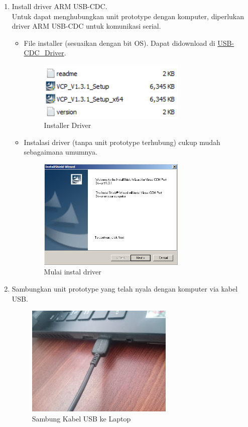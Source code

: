 \documentclass[12pt]{book}
\begin{document}
    \begin{enumerate}
    	\item Install driver ARM USB-CDC.\\
    	Untuk dapat menghubungkan unit prototype dengan komputer,
    	diperlukan driver ARM USB-CDC untuk komunikasi serial.

    	\begin{itemize}
    		\item File installer (sesuaikan dengan bit OS).
    		Dapat didownload di \href{https://drive.google.com/drive/folders/19gXVrxR68SFHQUGGGgKb0Da03oV7Rh41?usp=share_link}{USB-CDC\_Driver}.
    		\begin{figure}[!ht]
    			\centering
    			\includegraphics[width=200pt]{images/software/driver}
    			\caption{Installer Driver}
    		\end{figure}

    		\newpage
    		\item Instalasi driver (tanpa unit prototype terhubung) cukup mudah sebagaimana umumnya.
    		\begin{figure}[!ht]
    			\centering
    			\includegraphics[width=200pt]{images/software/install_driver}
    			\caption{Mulai instal driver}
    		\end{figure}
    	\end{itemize}

    	\item Sambungkan unit prototype yang telah nyala dengan komputer via kabel USB.
    	\begin{figure}[!ht]
    		\centering
    		\includegraphics[width=200pt]{images/pasang/laptop_usb}
    		\caption{Sambung Kabel USB ke Laptop}
    	\end{figure}


\end{enumerate}
\end{document}
